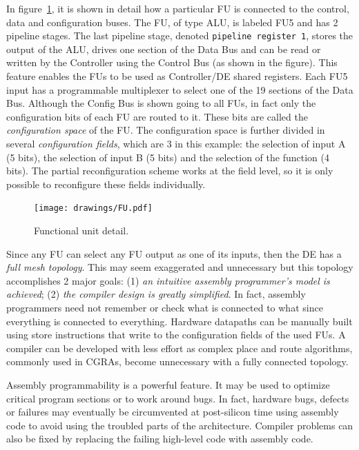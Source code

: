 In figure~\ref{fig_fu}, it is shown in detail how a particular FU is
connected to the control, data and configuration buses. The FU, of
type ALU, is labeled FU5 and has 2 pipeline stages. The last pipeline
stage, denoted {\tt pipeline register 1}, stores the output of the
ALU, drives one section of the Data Bus and can be read or written by
the Controller using the Control Bus (as shown in the figure). This
feature enables the FUs to be used as Controller/DE shared
registers. Each FU5 input has a programmable multiplexer to select one
of the 19 sections of the Data Bus. Although the Config Bus is shown
going to all FUs, in fact only the configuration bits of each FU are
routed to it. These bits are called the {\em configuration space} of
the FU. The configuration space is further divided in several {\em
  configuration fields}, which are 3 in this example: the selection of
input A (5 bits), the selection of input B (5 bits) and the selection
of the function (4 bits). The partial reconfiguration scheme works at
the field level, so it is only possible to reconfigure these fields
individually.

\begin{figure}[!htb]
\centering
\texttt{[image: drawings/FU.pdf]}
\caption{Functional unit detail.}
\label{fig_fu}
\end{figure}

Since any FU can select any FU output as one of its inputs, then the
DE has a {\em full mesh topology}. This may seem exaggerated and
unnecessary but this topology accomplishes 2 major goals: (1) {\em an
  intuitive assembly programmer's model is achieved}; (2) {\em the
  compiler design is greatly simplified}. In fact, assembly
programmers need not remember or check what is connected to what since
everything is connected to everything. Hardware datapaths can be
manually built using store instructions that write to the
configuration fields of the used FUs. A compiler can be developed with
less effort as complex place and route algorithms, commonly used in
CGRAs, become unnecessary with a fully connected topology.

Assembly programmability is a powerful feature. It may be used to
optimize critical program sections or to work around bugs. In fact,
hardware bugs, defects or failures may eventually be circumvented at
post-silicon time using assembly code to avoid using the troubled
parts of the architecture. Compiler problems can also be fixed by
replacing the failing high-level code with assembly code.

